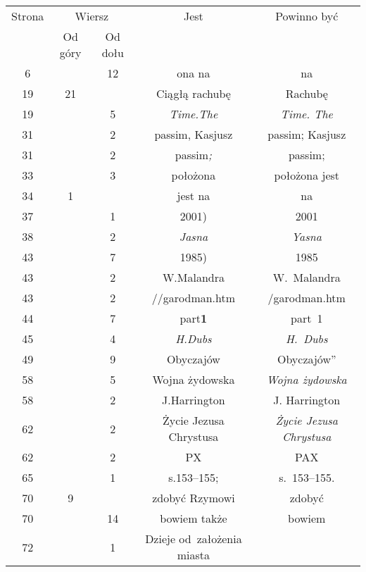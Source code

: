 \documentclass[a4paper,11pt]{article}
\begin{document}
\begin{center}

  \begin{tabular}{|c|c|c|c|c|}
    \hline
    Strona & \multicolumn{2}{c|}{Wiersz} & Jest
                              & Powinno być \\ \cline{2-3}
    & Od góry & Od dołu & & \\
    \hline
    \hphantom{0}6 & & 12 & ona na & na \\
    19 & 21 & & Ciągłą rachubę & Rachubę \\
    19 & & \hphantom{0}5 & \textit{Time.The} & \textit{Time. The} \\
    31 & & \hphantom{0}2 & passim, Kasjusz & passim; Kasjusz \\
    31 & & \hphantom{0}2 & passim\textit{;} & passim; \\
    33 & & \hphantom{0}3 & położona & położona jest \\
    34 & \hphantom{0}1 & & jest na & na \\
    37 & & \hphantom{0}1 & 2001) & 2001 \\
    38 & & \hphantom{0}2 & \textit{Jasna} & \textit{Yasna} \\
    43 & & \hphantom{0}7 & 1985) & 1985 \\
    43 & & \hphantom{0}2 & W.Malandra & W.~Malandra \\
    43 & & \hphantom{0}2 & //garodman.htm & /garodman.htm \\
    44 & & \hphantom{0}7 & part\textbf{1} & part~1 \\
    45 & & \hphantom{0}4 & \textit{H.Dubs} & \textit{H.~Dubs} \\
    49 & & \hphantom{0}9 & Obyczajów & Obyczajów” \\
    58 & & \hphantom{0}5 & Wojna żydowska & \textit{Wojna żydowska} \\
    58 & & \hphantom{0}2 & J.Harrington & J. Harrington \\
    62 & & \hphantom{0}2 & Życie Jezusa Chrystusa
    & \textit{Życie Jezusa Chrystusa} \\
    62 & & \hphantom{0}2 & PX & PAX \\
    65 & & \hphantom{0}1 & s.153--155; & s.~153--155. \\
    70 & \hphantom{0}9 & & zdobyć Rzymowi & zdobyć \\
    70 & & 14 & bowiem także & bowiem \\
    72 & & \hphantom{0}1 &  Dzieje od~założenia miasta

\end{tabular}
\end{center}
\end{document}
